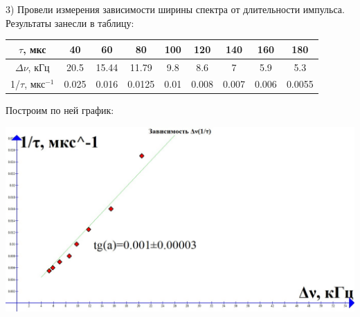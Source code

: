 \documentclass[a4paper,12pt]{article} %
\begin{document}
3) Провели измерения зависимости ширины спектра от длительности
импульса. Результаты занесли в таблицу: 
\begin{center}

	\begin{tabular}{|c|c|c|c|c|c|c|c|c|}
\hline 
$\tau$, мкс & 40 & 60 & 80 & 100 & 120 & 140 & 160 & 180 \\ 
\hline 
$\Delta\nu$, кГц & 20.5 & 15.44 & 11.79 & 9.8 & 8.6 & 7 & 5.9 & 5.3 \\ 
\hline 
1/$\tau$, мкс$^{-1}$ & 0.025 & 0.016 & 0.0125 & 0.01 & 0.008 & 0.007 & 0.006 & 0.0055 \\ 
\hline 
\end{tabular} 
\end{center}


Построим по ней график: \\
\begin{flushleft}

\includegraphics[scale=0.35]{3612}


\end{flushleft} 
\end{document}

